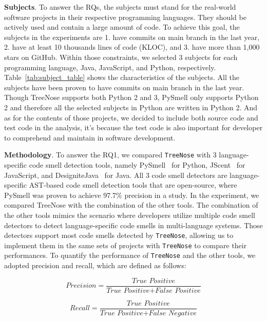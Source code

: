 {\bf Subjects}. To answer the RQs, the subjects must stand for the real-world
software projects in their respective programming languages. They should be
actively used and contain a large amount of code. To achieve this goal, the
subjects in the experiments are 1. have commits on main branch in the last
year, 2. have at least 10 thousands lines of code (KLOC), and 3. have more than
1,000 stars on GitHub. Within those constraints, we selected 3 subjects for
each programming language, Java, JavaScript, and Python, respectively.
Table~\ref{tab:subject_table} shows the characteristics of the subjects. All
the subjects have been proven to have commits on main branch in the last year.
Though TreeNose supports both Python 2 and 3, PySmell only supports Python 2
and therefore all the selected subjects in Python are written in Python 2. And
as for the contents of those projects, we decided to include both source code
and test code in the analysis, it's because the test code is also important for
developer to comprehend and maintain in software development.



{\bf Methodology}. To answer the RQ1, we compared \texttt{TreeNose} with 3
language-specific code smell detection tools, namely PySmell~\cite{Pysmell} for
Python, JScent~\cite{Jscent} for JavaScript, and
DesigniteJava~\cite{DesigniteJava} for Java. All 3 code smell detectors are
language-specific AST-based code smell detection tools that are open-source,
where PySmell was proven to achieve 97.7\% precision in a study. In the
experiment, we compared TreeNose with the combination of the other tools. The
combination of the other tools mimics the scenario where developers utilize
multiple code smell detectors to detect language-specific code smells in
multi-language systems. Those detectors support most code smells detected by
\texttt{TreeNose}, allowing us to implement them in the same sets of projects
with \texttt{TreeNose} to compare their performances. To quantify the
performance of \texttt{TreeNose} and the other tools, we adopted precision and
recall, which are defined as follows:

\vspace{-0.5em}

\begin{equation}
    \textit{Precision} = \frac{\textit{True Positive}}{\textit{True Positive} + \textit{False Positive}}
\end{equation}

\begin{equation}
    \textit{Recall} = \frac{\textit{True Positive}}{\textit{True Positive} + \textit{False Negative}}
\end{equation}

